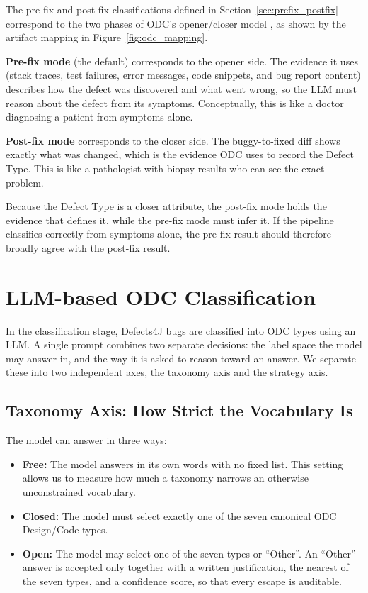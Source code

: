 \documentclass{iutbscthesis}
\begin{document}
The pre-fix and post-fix classifications defined in Section~\ref{sec:prefix_postfix} correspond to the two phases of ODC's opener/closer model \cite{chillarege1992odc}, as shown by the artifact mapping in Figure~\ref{fig:odc_mapping}.

\textbf{Pre-fix mode} (the default) corresponds to the opener side. The evidence it uses (stack traces, test failures, error messages, code snippets, and bug report content) describes how the defect was discovered and what went wrong, so the LLM must reason about the defect from its symptoms. Conceptually, this is like a doctor diagnosing a patient from symptoms alone.

\textbf{Post-fix mode} corresponds to the closer side. The buggy-to-fixed diff shows exactly what was changed, which is the evidence ODC uses to record the Defect Type. This is like a pathologist with biopsy results who can see the exact problem.

Because the Defect Type is a closer attribute, the post-fix mode holds the evidence that defines it, while the pre-fix mode must infer it. If the pipeline classifies correctly from symptoms alone, the pre-fix result should therefore broadly agree with the post-fix result.

\section{LLM-based ODC Classification}
\label{sec:conditions}

In the classification stage, Defects4J bugs are classified into ODC types using an LLM. A single prompt combines two separate decisions: the label space the model may answer in, and the way it is asked to reason toward an answer. We separate these into two independent axes, the taxonomy axis and the strategy axis.

\subsection{Taxonomy Axis: How Strict the Vocabulary Is}

The model can answer in three ways:

\begin{itemize}
    \item \textbf{Free:} The model answers in its own words with no fixed list. This setting allows us to measure how much a taxonomy narrows an otherwise unconstrained vocabulary.
    \item \textbf{Closed:} The model must select exactly one of the seven canonical ODC Design/Code types.
    \item \textbf{Open:} The model may select one of the seven types or ``Other''. An ``Other'' answer is accepted only together with a written justification, the nearest of the seven types, and a confidence score, so that every escape is auditable.
\end{itemize}
\end{document}
